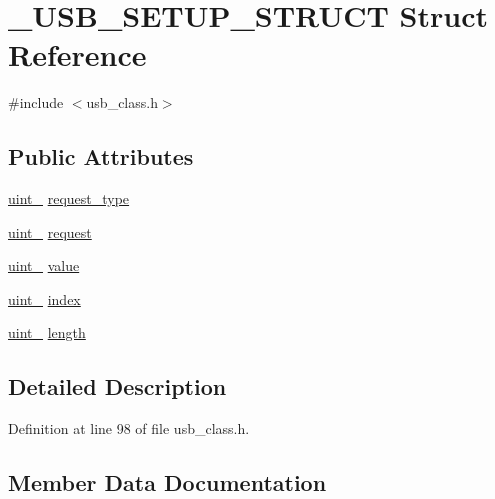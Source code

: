 \hypertarget{struct___u_s_b___s_e_t_u_p___s_t_r_u_c_t}{}\section{\+\_\+\+U\+S\+B\+\_\+\+S\+E\+T\+U\+P\+\_\+\+S\+T\+R\+U\+CT Struct Reference}
\label{struct___u_s_b___s_e_t_u_p___s_t_r_u_c_t}


{\ttfamily \#include $<$usb\+\_\+class.\+h$>$}

\subsection*{Public Attributes}
\begin{DoxyCompactItemize}
\item 
\hyperlink{types_8h_ad3209046c23f739a81581c10a4be7d92}{uint\+\_} \hyperlink{struct___u_s_b___s_e_t_u_p___s_t_r_u_c_t_ac722258b4f1e0f0aba02687975e8520b}{request\+\_\+type}
\item 
\hyperlink{types_8h_ad3209046c23f739a81581c10a4be7d92}{uint\+\_} \hyperlink{struct___u_s_b___s_e_t_u_p___s_t_r_u_c_t_ac236b09d16923ad235bc749d1ef2d7df}{request}
\item 
\hyperlink{types_8h_a8ab774e38493b7c7e4d8edfd5004e66b}{uint\+\_} \hyperlink{struct___u_s_b___s_e_t_u_p___s_t_r_u_c_t_a528ad369a038957703eb904e7dcd18d3}{value}
\item 
\hyperlink{types_8h_a8ab774e38493b7c7e4d8edfd5004e66b}{uint\+\_} \hyperlink{struct___u_s_b___s_e_t_u_p___s_t_r_u_c_t_a85f2094f0e90c49aa37f4340ee73c812}{index}
\item 
\hyperlink{types_8h_a8ab774e38493b7c7e4d8edfd5004e66b}{uint\+\_} \hyperlink{struct___u_s_b___s_e_t_u_p___s_t_r_u_c_t_a8a1d52ad23f4a8979ec2d923ee30bd03}{length}
\end{DoxyCompactItemize}


\subsection{Detailed Description}


Definition at line 98 of file usb\+\_\+class.\+h.



\subsection{Member Data Documentation}
